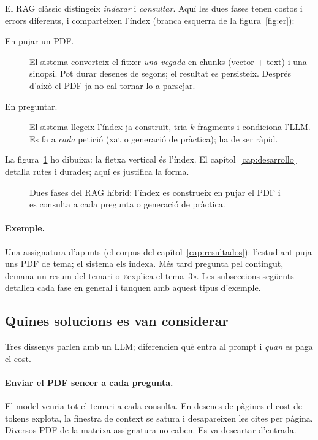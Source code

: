 El RAG clàssic \parencite{lewis2020rag} distingeix \emph{indexar} i \emph{consultar}. Aquí les dues fases tenen costos i errors diferents, i comparteixen l'índex (branca esquerra de la figura~\ref{fig:er}):

\begin{description}
  \item[En pujar un PDF.] El sistema converteix el fitxer \emph{una vegada} en chunks (vector + text) i una sinopsi. Pot durar desenes de segons; el resultat es persisteix. Després d'això el PDF ja no cal tornar-lo a parsejar.
  \item[En preguntar.] El sistema llegeix l'índex ja construït, tria $k$ fragments i condiciona l'LLM. Es fa a \emph{cada} petició (xat o generació de pràctica); ha de ser ràpid.
\end{description}

La figura~\ref{fig:rag-dos-temps} ho dibuixa: la fletxa vertical és l'índex. El capítol~\ref{cap:desarrollo} detalla rutes i durades; aquí es justifica la forma.

\begin{figure}[htbp]
\centering

\caption{Dues fases del RAG híbrid: l'índex es construeix en pujar el PDF i es consulta a cada pregunta o generació de pràctica.}
\label{fig:rag-dos-temps}
\end{figure}

\paragraph{Exemple.}
Una assignatura d'apunts (el corpus del capítol~\ref{cap:resultados}): l'estudiant puja uns PDF de tema; el sistema els indexa. Més tard pregunta pel contingut, demana un resum del temari o «explica el tema~3». Les subseccions següents detallen cada fase en general i tanquen amb aquest tipus d'exemple.

\subsection{Quines solucions es van considerar}

Tres dissenys parlen amb un LLM; diferencien què entra al prompt i \emph{quan} es paga el cost.

\paragraph{Enviar el PDF sencer a cada pregunta.}
El model veuria tot el temari a cada consulta. En desenes de pàgines el cost de tokens explota, la finestra de context se satura i desapareixen les cites per pàgina. Diversos PDF de la mateixa assignatura no caben. Es va descartar d'entrada.


